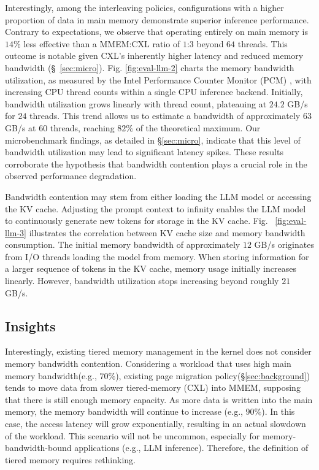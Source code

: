 Interestingly, among the interleaving policies, configurations with a higher proportion of data in main memory demonstrate superior inference performance. Contrary to expectations, we observe that operating entirely on main memory is $14\%$ less effective than a MMEM:CXL ratio of $1$:$3$ beyond $64$ threads. This outcome is notable given CXL's inherently higher latency and reduced memory bandwidth (\S~\ref{sec:micro}). Fig. \ref{fig:eval-llm-2} charts the memory bandwidth utilization, as measured by the Intel Performance Counter Monitor (PCM) \cite{pcm}, with increasing CPU thread counts within a single CPU inference backend. Initially, bandwidth utilization grows linearly with thread count, plateauing at $24.2$ GB/s for $24$ threads. This trend allows us to estimate a bandwidth of approximately $63$ GB/s at $60$ threads, reaching $82\%$ of the theoretical maximum. Our microbenchmark findings, as detailed in \S\ref{sec:micro}, indicate that this level of bandwidth utilization may lead to significant latency spikes. These results corroborate the hypothesis that bandwidth contention plays a crucial role in the observed performance degradation.

Bandwidth contention may stem from either loading the LLM model or accessing the KV cache. Adjusting the prompt context to infinity enables the LLM model to continuously generate new tokens for storage in the KV cache. Fig. ~\ref{fig:eval-llm-3} illustrates the correlation between KV cache size and memory bandwidth consumption. The initial memory bandwidth of approximately $12$ GB/s originates from I/O threads loading the model from memory. When storing information for a larger sequence of tokens in the KV cache, memory usage initially increases linearly. However, bandwidth utilization stops increasing beyond roughly $21$ GB/s. 

\subsection{Insights}
Interestingly, existing tiered memory management in the kernel does not consider memory bandwidth contention. Considering a workload that uses high main memory bandwidth(e.g., $70\%$), existing page migration policy(\S\ref{sec:background}) tends to move data from slower tiered-memory (CXL) into MMEM, supposing that there is still enough memory capacity. As more data is written into the main memory, the memory bandwidth will continue to increase (e.g., $90\%$). In this case, the access latency will grow exponentially, resulting in an actual slowdown of the workload. This scenario will not be uncommon, especially for memory-bandwidth-bound applications (e.g., LLM inference). Therefore, the definition of tiered memory requires rethinking.











